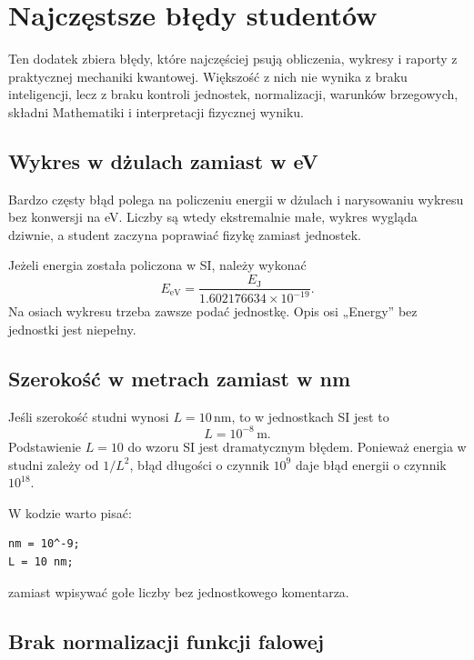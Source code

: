 \chapter{Najczęstsze błędy studentów}

\begin{summarybox}
Ten dodatek zbiera błędy, które najczęściej psują obliczenia, wykresy i raporty z
praktycznej mechaniki kwantowej. Większość z nich nie wynika z braku inteligencji,
lecz z braku kontroli jednostek, normalizacji, warunków brzegowych, składni
Mathematiki i interpretacji fizycznej wyniku.
\end{summarybox}

\section{Wykres w dżulach zamiast w eV}

Bardzo częsty błąd polega na policzeniu energii w dżulach i narysowaniu wykresu
bez konwersji na eV. Liczby są wtedy ekstremalnie małe, wykres wygląda dziwnie, a
student zaczyna poprawiać fizykę zamiast jednostek.

Jeżeli energia została policzona w SI, należy wykonać
\begin{equation}
    E_{\mathrm{eV}}=\frac{E_{\mathrm{J}}}{1.602176634\times10^{-19}}.
\end{equation}
Na osiach wykresu trzeba zawsze podać jednostkę. Opis osi „Energy” bez jednostki
jest niepełny.

\section{Szerokość w metrach zamiast w nm}

Jeśli szerokość studni wynosi \(L=10\,\mathrm{nm}\), to w jednostkach SI jest to
\begin{equation}
    L=10^{-8}\,\mathrm{m}.
\end{equation}
Podstawienie \(L=10\) do wzoru SI jest dramatycznym błędem. Ponieważ energia w
studni zależy od \(1/L^2\), błąd długości o czynnik \(10^9\) daje błąd energii o
czynnik \(10^{18}\).

W kodzie warto pisać:
\begin{verbatim}
nm = 10^-9;
L = 10 nm;
\end{verbatim}
zamiast wpisywać gołe liczby bez jednostkowego komentarza.

\section{Brak normalizacji funkcji falowej}

